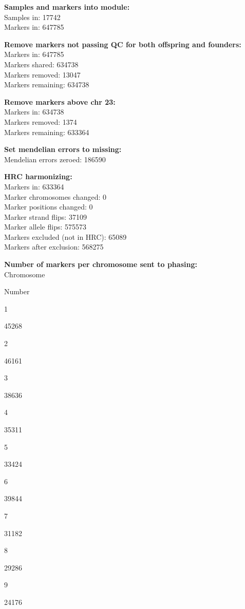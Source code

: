 \documentclass[]{article}
\begin{document}
\textbf{Samples and markers into module:}\\
Samples in: 17742\\
Markers in: 647785

\textbf{Remove markers not passing QC for both offspring and
founders:}\\
Markers in: 647785\\
Markers shared: 634738\\
Markers removed: 13047\\
Markers remaining: 634738

\textbf{Remove markers above chr 23:}\\
Markers in: 634738\\
Markers removed: 1374\\
Markers remaining: 633364

\textbf{Set mendelian errors to missing:}\\
Mendelian errors zeroed: 186590

\textbf{HRC harmonizing:}\\
Markers in: 633364\\
Marker chromosomes changed: 0\\
Marker positions changed: 0\\
Marker strand flips: 37109\\
Marker allele flips: 575573\\
Markers excluded (not in HRC): 65089\\
Markers after exclusion: 568275

\textbf{Number of markers per chromosome sent to phasing:}\\

Chromosome

Number

1

45268

2

46161

3

38636

4

35311

5

33424

6

39844

7

31182

8

29286

9

24176
\end{document}
